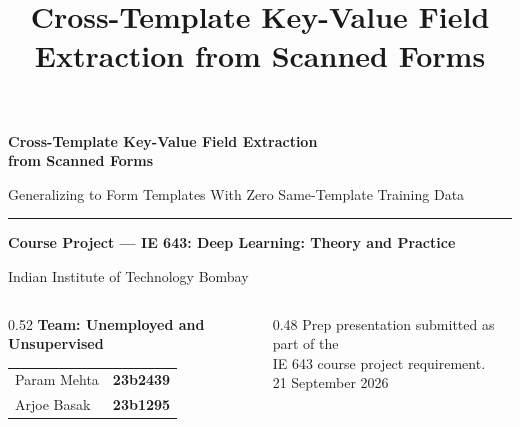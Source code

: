 \documentclass[aspectratio=169, 11pt]{beamer}
\title{Cross-Template Key-Value Field Extraction from Scanned Forms}
\date{}
\author{}
\begin{document}
{
\begin{frame}[plain]
  \vspace{0.2cm}
  {\Large\bfseries Cross-Template Key-Value Field Extraction\\from Scanned Forms\par}
  \vspace{0.15cm}
  {\normalsize\color{muted} Generalizing to Form Templates With Zero Same-Template Training Data\par}
  \vspace{0.4cm}
  \rule{\textwidth}{0.8pt}
  \vspace{0.3cm}

  {\large\bfseries Course Project — IE 643: Deep Learning: Theory and Practice\par}
  \vspace{0.1cm}
  {\normalsize Indian Institute of Technology Bombay\par}
  \vspace{0.45cm}

  \begin{columns}[T]
    \begin{column}{0.52\textwidth}
      {\bfseries Team: Unemployed and Unsupervised}\\[0.25cm]
      \begin{tabular}{@{}ll@{}}
        Param Mehta & \textbf{23b2439}\\
        Arjoe Basak & \textbf{23b1295}\\
      \end{tabular}
    \end{column}
    \begin{column}{0.48\textwidth}
      \footnotesize\color{muted}
      Prep presentation submitted as part of the\\
      IE 643 course project requirement.\\[0.2cm]
      21 September 2026
    \end{column}
  \end{columns}
\end{frame}
}
\end{document}
